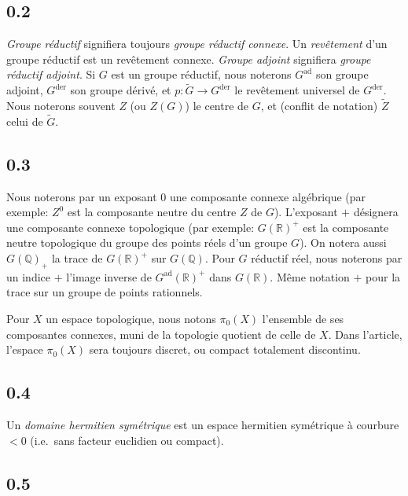 \documentclass[12pt,a4paper]{article}
\theoremstyle{plain}
\theoremstyle{definition}
\theoremstyle{remark}
\newcommand{\QQ}{\mathbb{Q}}
\newcommand{\RR}{\mathbb{R}}
\begin{document}
\subsection*{0.2}

\textit{Groupe r\'eductif} signifiera toujours \textit{groupe r\'eductif connexe}. Un \textit{rev\^etement} d'un groupe r\'eductif est un rev\^etement connexe. \textit{Groupe adjoint} signifiera \textit{groupe r\'eductif adjoint}. Si $G$ est un groupe r\'eductif, nous noterons $G^{\text{ad}}$ son groupe adjoint, $G^{\text{der}}$ son groupe d\'eriv\'e, et $p:\tilde{G} \to G^{\text{der}}$ le rev\^etement universel de $G^{\text{der}}$. Nous noterons souvent $Z$ (ou $Z(G)$) le centre de $G$, et (conflit de notation) $\tilde{Z}$ celui de $\tilde{G}$.

\subsection*{0.3}

Nous noterons par un exposant $0$ une composante connexe alg\'ebrique (par exemple: $Z^0$ est la composante neutre du centre $Z$ de $G$). L'exposant $+$ d\'esignera une composante connexe topologique (par exemple: $G(\RR)^+$ est la composante neutre topologique du groupe des points r\'eels d'un groupe $G$). On notera aussi $G(\QQ)_+$ la trace de $G(\RR)^+$ sur $G(\QQ)$. Pour $G$ r\'eductif r\'eel, nous noterons par un indice $+$ l'image inverse de $G^{\text{ad}}(\RR)^+$ dans $G(\RR)$. M\^eme notation $+$ pour la trace sur un groupe de points rationnels.

Pour $X$ un espace topologique, nous notons $\pi_0(X)$ l'ensemble de ses composantes connexes, muni de la topologie quotient de celle de $X$. Dans l'article, l'espace $\pi_0(X)$ sera toujours discret, ou compact totalement discontinu.

\subsection*{0.4}

Un \textit{domaine hermitien sym\'etrique} est un espace hermitien sym\'etrique \`a courbure $< 0$ (i.e.~sans facteur euclidien ou compact).

\subsection*{0.5}
\end{document}

